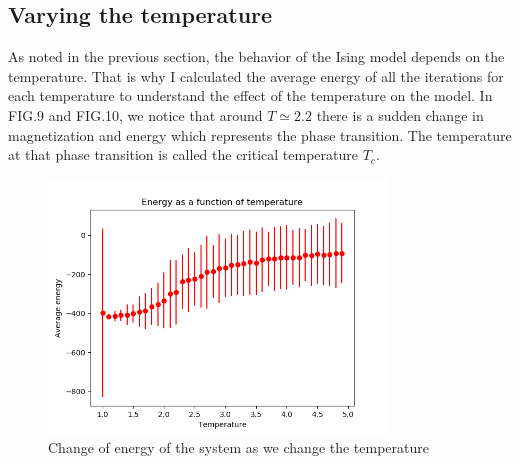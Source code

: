 \documentclass[aps,twocolumn,twoside,secnumarabic,balancelastpage,amsmath,amssymb,nofootinbib,hyperref=pdftex]{revtex4}
\begin{document}
\subsection{Varying the temperature}
\par As noted in the previous section, the behavior of the Ising model depends on the temperature. That is why I calculated the average energy of all the iterations for each temperature to understand the effect of the temperature on the model. In FIG.9 and FIG.10, we notice that around $T \simeq 2.2$ there is a sudden change in magnetization and energy which represents the phase transition. The temperature at that phase transition is called the critical temperature $T_c$. 
\begin{figure}[htb]
\includegraphics[width=9cm]{E_Temperature.png}	
\caption{Change of energy of the system as we change the temperature}
\end{figure}
\end{document}
